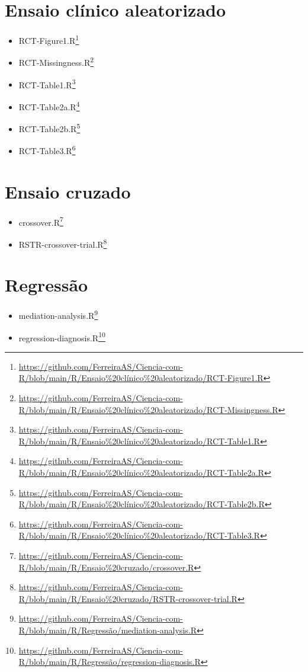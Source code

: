 \documentclass[
  a4paper,
]{book}
\renewcommand{\href}[2]{#2\footnote{\url{#1}}}
\begin{document}
\hypertarget{ensaio-clinico-aleatorizado}{%
\section{Ensaio clínico aleatorizado}\label{ensaio-clinico-aleatorizado}}

\begin{itemize}
\item
  \href{https://github.com/FerreiraAS/Ciencia-com-R/blob/main/R/Ensaio\%20clínico\%20aleatorizado/RCT-Figure1.R}{RCT-Figure1.R}
\item
  \href{https://github.com/FerreiraAS/Ciencia-com-R/blob/main/R/Ensaio\%20clínico\%20aleatorizado/RCT-Missingness.R}{RCT-Missingness.R}
\item
  \href{https://github.com/FerreiraAS/Ciencia-com-R/blob/main/R/Ensaio\%20clínico\%20aleatorizado/RCT-Table1.R}{RCT-Table1.R}
\item
  \href{https://github.com/FerreiraAS/Ciencia-com-R/blob/main/R/Ensaio\%20clínico\%20aleatorizado/RCT-Table2a.R}{RCT-Table2a.R}
\item
  \href{https://github.com/FerreiraAS/Ciencia-com-R/blob/main/R/Ensaio\%20clínico\%20aleatorizado/RCT-Table2b.R}{RCT-Table2b.R}
\item
  \href{https://github.com/FerreiraAS/Ciencia-com-R/blob/main/R/Ensaio\%20clínico\%20aleatorizado/RCT-Table3.R}{RCT-Table3.R}
\end{itemize}

\hypertarget{ensaio-cruzado}{%
\section{Ensaio cruzado}\label{ensaio-cruzado}}

\begin{itemize}
\item
  \href{https://github.com/FerreiraAS/Ciencia-com-R/blob/main/R/Ensaio\%20cruzado/crossover.R}{crossover.R}
\item
  \href{https://github.com/FerreiraAS/Ciencia-com-R/blob/main/R/Ensaio\%20cruzado/RSTR-crossover-trial.R}{RSTR-crossover-trial.R}
\end{itemize}

\hypertarget{regressuxe3o}{%
\section{Regressão}\label{regressuxe3o}}

\begin{itemize}
\item
  \href{https://github.com/FerreiraAS/Ciencia-com-R/blob/main/R/Regressão/mediation-analysis.R}{mediation-analysis.R}
\item
  \href{https://github.com/FerreiraAS/Ciencia-com-R/blob/main/R/Regressão/regression-diagnosis.R}{regression-diagnosis.R}
\end{itemize}
\end{document}
